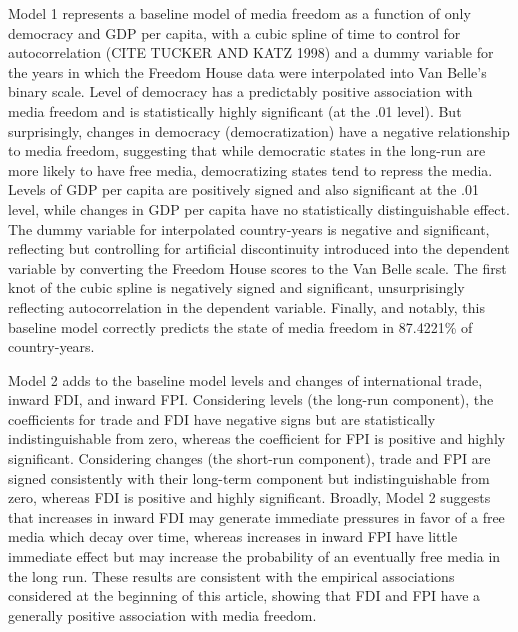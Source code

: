 \documentclass[a4paper]{article}\usepackage[]{graphicx}\usepackage[]{color}
\begin{document}
Model 1 represents a baseline model of media freedom as a function of only democracy and GDP per capita, with a cubic spline of time to control for autocorrelation (CITE TUCKER AND KATZ 1998) and a dummy variable for the years in which the Freedom House data were interpolated into Van Belle's binary scale. Level of democracy has a predictably positive association with media freedom and is statistically highly significant (at the .01 level). But surprisingly, changes in democracy (democratization) have a negative relationship to media freedom, suggesting that while democratic states in the long-run are more likely to have free media, democratizing states tend to repress the media. Levels of GDP per capita are positively signed and also significant at the .01 level, while changes in GDP per capita have no statistically distinguishable effect. The dummy variable for interpolated country-years is negative and significant, reflecting but controlling for artificial discontinuity introduced into the dependent variable by converting the Freedom House scores to the Van Belle scale. The first knot of the cubic spline is negatively signed and significant, unsurprisingly reflecting autocorrelation in the dependent variable. Finally, and notably, this baseline model correctly predicts the state of media freedom in 87.4221\% of country-years.

Model 2 adds to the baseline model levels and changes of international trade, inward FDI, and inward FPI. Considering levels (the long-run component), the coefficients for trade and FDI have negative signs but are statistically indistinguishable from zero, whereas the coefficient for FPI is positive and highly significant. Considering changes (the short-run component), trade and FPI are signed consistently with their long-term component but indistinguishable from zero, whereas FDI is positive and highly significant. Broadly, Model 2 suggests that increases in inward FDI may generate immediate pressures in favor of a free media which decay over time, whereas increases in inward FPI have little immediate effect but may increase the probability of an eventually free media in the long run. These results are consistent with the empirical associations considered at the beginning of this article, showing that FDI and FPI have a generally positive association with media freedom.
\end{document}
